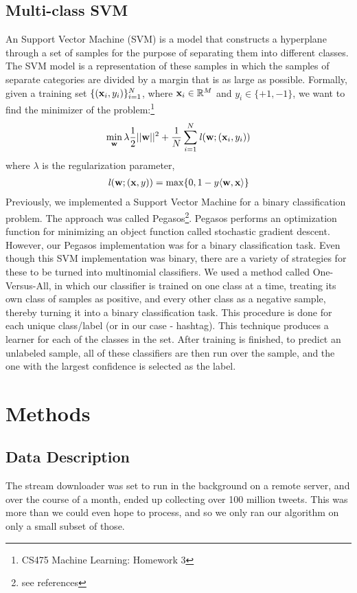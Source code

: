 \documentclass[11pt,letterpaper]{article}
\newcommand{\vw}{{\bf w}}
\newcommand{\vx}{{\bf x}}
\newcommand{\vxi}{{\bf x}_i}
\newcommand{\yi}{y_i}
\begin{document}
\subsection{Multi-class SVM}
An Support Vector Machine (SVM) is a model that constructs a hyperplane through a set of samples for the purpose of separating them into different classes. The SVM model is a representation of these samples in which the samples of separate categories are divided by a margin that is as large as possible. Formally, given a training set $\{(\vxi,\yi)\}_{i=1}^N$, where $\vx_i \in \mathbb{R}^M$ and $y_i \in\{+1,-1\}$, we want to find the minimizer of the problem:\footnote{CS475 Machine Learning: Homework 3}
\begin{align}
\label{eq:obj}
\min_\vw \lambda \frac{1}{2}||\vw||^2+\frac{1}{N} \sum\limits_{i=1}^N \mathit{l}(\vw;(\vxi,\yi))
\end{align}
where $\lambda$ is the regularization parameter,
\begin{align}
\mathit{l}(\vw;(\vx,y))=\max\{0,1-y\langle \vw , \vx\rangle\}
\end{align}
Previously, we implemented a Support Vector Machine for a binary classification problem. The approach was called Pegasos\footnote{see references}. Pegasos performs an optimization function for minimizing an object function called stochastic gradient descent. However, our Pegasos implementation was for a binary classification task. Even though this SVM implementation was binary, there are a variety of strategies for these to be turned into multinomial classifiers. We used a method called One-Versus-All, in which our classifier is trained on one class at a time, treating its own class of samples as positive, and every other class as a negative sample, thereby turning it into a binary classification task. This procedure is done for each unique class/label (or in our case - hashtag). This technique produces a learner for each of the classes in the set. After training is finished, to predict an unlabeled sample, all of these classifiers are then run over the sample, and the one with the largest confidence is selected as the label.

\section{Methods}
\subsection{Data Description}
The stream downloader was set to run in the background on a remote server, and over the course of a month, ended up collecting over 100 million tweets. This was more than we could even hope to process, and so we only ran our algorithm on only a small subset of those.
\end{document}

